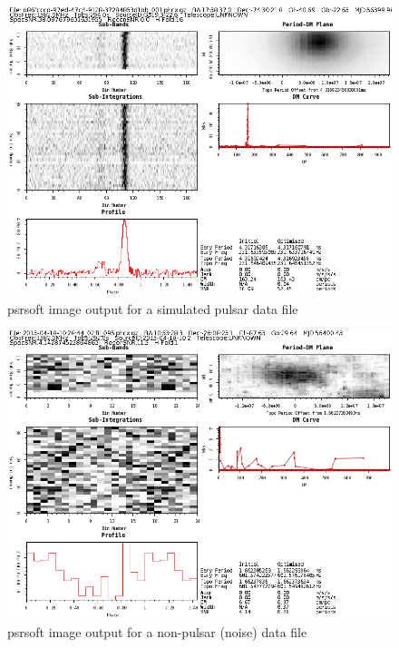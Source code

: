 \documentclass[12pt]{article}
\begin{document}
\begin{figure}[h!]
\begin{center}
\includegraphics[scale=0.4]{d86fcccd-97ed-47c4-9128-37284853d1bb_001.png}
\caption{psrsoft image output for a simulated pulsar data file}
\label{psrsoftsim}
\end{center}
\end{figure}

\begin{figure}[h!]
\begin{center}
\includegraphics[scale=0.4]{2013-04-18-10_28_44_02_fil_095.png}
\caption{psrsoft image output for a non-pulsar (noise) data file}
\label{psrsoftnoise}
\end{center}
\end{figure}
\end{document}
